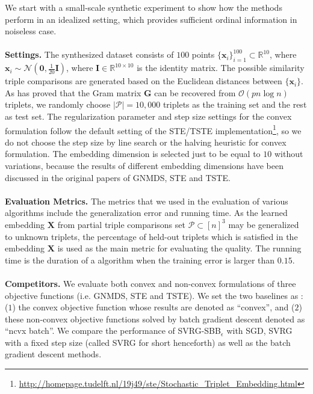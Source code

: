 \documentclass[letterpaper]{article} %
\begin{document}
We start with a small-scale synthetic experiment to show how the methods perform in an idealized setting, which provides sufficient ordinal information in noiseless case.
\\\\
\textbf{Settings.} The synthesized dataset consists of $100$ points $\{\mathbf{x}_i\}_{i=1}^{100}\subset\mathbb{R}^{10}$, where $\mathbf{x}_i\sim\mathcal{N}(\mathbf{0}, \frac{1}{20}\mathbf{I})$, where $\mathbf{I}\in \mathbb{R}^{10\times 10}$ is the identity matrix. The possible similarity triple comparisons are generated based on the Euclidean distances between $\{\mathbf{x}_i\}$. As \cite{NIPS2016_6554} has proved that the Gram matrix $\mathbf{G}$ can be recovered from $\mathcal{O}(pn\log n)$ triplets, we randomly choose $|\mathcal{P}|=10,000$ triplets as the training set and the rest as test set. The regularization parameter and step size settings for the convex formulation follow the default setting of the STE/TSTE implementation\footnote{\url{http://homepage.tudelft.nl/19j49/ste/Stochastic_Triplet_Embedding.html}}, so we do not choose the step size by line search or the halving heuristic for convex formulation. The embedding dimension is selected just to be equal to $10$ without variations, because the results of different embedding dimensions have been discussed in the original papers of GNMDS, STE and TSTE.
\\\\
\textbf{Evaluation Metrics. }The metrics that we used in the evaluation of various algorithms include the generalization error and running time. As the learned embedding $\mathbf{X}$ from partial triple comparisons set $\mathcal{P}\subset[n]^3$ may be generalized to unknown triplets, the percentage of held-out triplets which is satisfied in the embedding $\mathbf{X}$ is used as the main metric for evaluating the quality. The running time is the duration of a algorithm when the training error is larger than $0.15$.
\\\\
\textbf{Competitors.} We evaluate both convex and non-convex formulations of three objective functions (i.e. GNMDS, STE and TSTE). We set the two baselines as : ($1$) the convex objective function whose results are denoted as ``convex'', and ($2$) these non-convex objective functions solved by batch gradient descent denoted as ``ncvx batch''. We compare the performance of SVRG-SBB$_\epsilon$ with SGD, SVRG with a fixed step size (called SVRG for short henceforth) as well as the batch gradient descent methods.
\end{document}
